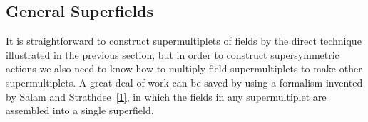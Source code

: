 
\subsection{General Superfields}

\providecommand{\gradedbracket}[2]{\left[#1,#2\right\}}
\providecommand{\SuperQ}{\mathcal{Q}}
\providecommand{\SuperD}{\mathcal{D}}

It is straightforward to construct supermultiplets of fields by the direct
technique illustrated in the previous section, but in order to construct
supersymmetric actions we also need to know how to multiply field
supermultiplets to make other supermultiplets. A great deal of work can be
saved by using a formalism invented by Salam and
Strathdee~\hyperref[ch26-ref-1]{[1]}, in which the fields in any
supermultiplet are assembled into a single superfield.

